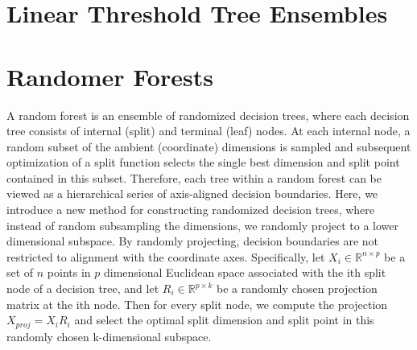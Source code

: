 \documentclass{article} %
\newcommand{\jovo}[1]{{\color{magenta}{\it jovo says: #1}}}
\begin{document}



\section{Linear Threshold Tree Ensembles}





\section{Randomer Forests}
A random forest is an ensemble of randomized decision trees, where each decision tree consists of internal (split) and terminal (leaf) nodes. At each internal node, a random subset of the ambient (coordinate) dimensions is sampled and subsequent optimization of a split function selects the single best dimension and split point contained in this subset. Therefore, each tree within a random forest can be viewed as a hierarchical series of axis-aligned decision boundaries. Here, we introduce a new method for constructing randomized decision trees, where instead of random subsampling the dimensions, we randomly project to a lower dimensional subspace. By randomly projecting, decision boundaries are not restricted to alignment with the coordinate axes. Specifically, let $X_i \in \mathbb{R}^{n\times p}$ be a set of $n$ points in $p$ dimensional Euclidean space associated with the ith split node of a decision tree, and let $R_i \in \mathbb{R}^{p\times k}$ be a randomly chosen projection matrix at the ith node. Then for every split node, we compute the projection $X_{proj} = X_iR_i$ and select the optimal split dimension and split point in this randomly chosen k-dimensional subspace.
\end{document}
